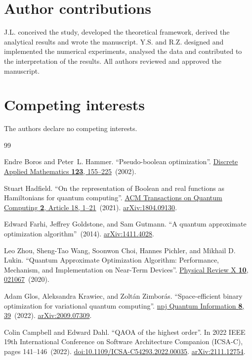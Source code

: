 \documentclass[a4paper,onecolumn,11pt,unpublished]{quantumarticle}
\theoremstyle{remark}
\begin{document}
\section*{Author contributions}
J.L. conceived the study, developed the theoretical framework, derived the analytical results and wrote the manuscript. Y.S. and R.Z. designed and implemented the numerical experiments, analysed the data and contributed to the interpretation of the results. All authors reviewed and approved the manuscript.

\section*{Competing interests}
The authors declare no competing interests.

\begingroup
\small
\begin{thebibliography}{99}

Endre Boros and Peter~L. Hammer.
\newblock ``Pseudo-boolean optimization''.
\newblock \href{https://dx.doi.org/10.1016/S0166-218X(01)00341-9}{Discrete Applied Mathematics {\bf 123}, 155--225}~(2002).

Stuart Hadfield.
\newblock ``On the representation of Boolean and real functions as Hamiltonians for quantum computing''.
\newblock \href{https://dx.doi.org/10.1145/3478519}{ACM Transactions on Quantum Computing {\bf 2}, Article 18, 1--21}~(2021).
\newblock \href{http://arxiv.org/abs/1804.09130}{arXiv:1804.09130}.

Edward Farhi, Jeffrey Goldstone, and Sam Gutmann.
\newblock ``A quantum approximate optimization algorithm''~(2014).
\newblock \href{http://arxiv.org/abs/1411.4028}{arXiv:1411.4028}.

Leo Zhou, Sheng-Tao Wang, Soonwon Choi, Hannes Pichler, and Mikhail D. Lukin.
\newblock ``Quantum Approximate Optimization Algorithm: Performance, Mechanism, and Implementation on Near-Term Devices''.
\newblock \href{https://doi.org/10.1103/physrevx.10.021067}{Physical Review X {\bf 10}, 021067}~(2020).


Adam Glos, Aleksandra Krawiec, and Zolt{\'a}n Zimbor{\'a}s.
\newblock ``Space-efficient binary optimization for variational quantum computing''.
\newblock \href{https://dx.doi.org/10.1038/s41534-022-00546-y}{npj Quantum Information {\bf 8}, 39}~(2022).
\newblock \href{http://arxiv.org/abs/2009.07309}{arXiv:2009.07309}.

Colin Campbell and Edward Dahl.
\newblock ``QAOA of the highest order''.
\newblock In 2022 IEEE 19th International Conference on Software Architecture Companion (ICSA-C), pages 141--146~(2022).
\newblock \href{https://dx.doi.org/10.1109/ICSA-C54293.2022.00035}{doi:10.1109/ICSA-C54293.2022.00035}.
\newblock \href{http://arxiv.org/abs/2111.12754}{arXiv:2111.12754}.


\end{thebibliography}
\end{document}
